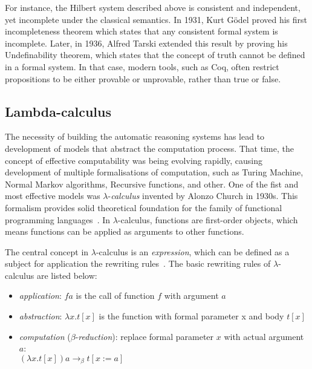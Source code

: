 \documentclass[article]{aaltoseries}
\begin{document}
For instance, the Hilbert system described above is consistent and independent, yet incomplete under the classical semantics. In 1931, Kurt Gödel proved his first incompleteness theorem which states that any consistent formal system is incomplete. Later, in 1936, Alfred Tarski extended this result by proving his Undefinability theorem, which states that the concept of truth cannot be defined in a formal system. 
In that case, modern tools, such as Coq, often restrict propositions to be either provable or unprovable, rather than true or false.


\subsection{Lambda-calculus}
\label{sec:lambda}

The necessity of building the automatic reasoning systems has lead to development of models that abstract the computation process. That time, the concept of effective computability was being evolving rapidly, causing development of multiple formalisations of computation, such as Turing Machine, Normal Markov algorithms, Recursive functions, and other. One of the fist and most effective models was $\lambda$-\textit{calculus} invented by Alonzo Church in 1930s. This formalism provides solid theoretical foundation for the family of functional programming languages~\cite{Roj15}. In $\lambda$-calculus, functions are first-order objects, which means functions can be applied as arguments to other functions.

The central concept in $\lambda$-calculus is an \textit{expression}, which can be defined as a subject for application the rewriting rules~\cite{Bar88}. The basic rewriting rules of $\lambda$-calculus are listed below:

\begin{itemize}
\itemsep0em
	\item \textit{application}:
	$f a$ is the call of function $f$ with argument $a$
	
	\item \textit{abstraction}:
	$\lambda x.t[x]$ is the function with formal parameter x and body $t[x]$
	
	\item \textit{computation} ($\beta$-\textit{reduction}): replace formal parameter $x$ with actual argument $a$: \\
	$(\lambda x.t[x]) a \rightarrow_{\beta} t[x:=a]$
\end{itemize}
\end{document}
